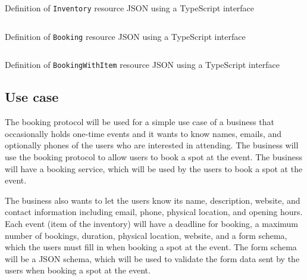 \begin{listing}
    \inputminted[breaklines]{typescript}{content/design/booking_protocol_inventory_interface.ts}
    \caption{Definition of \texttt{Inventory} resource JSON using a TypeScript interface}
    \label{code:booking_protocol_inventory_interface}
\end{listing}

\begin{listing}
    \inputminted[breaklines]{typescript}{content/design/booking_protocol_booking_interface.ts}
    \caption{Definition of \texttt{Booking} resource JSON using a TypeScript interface}
    \label{code:booking_protocol_booking_interface}
\end{listing}

\begin{listing}
    \inputminted[breaklines]{typescript}{content/design/booking_protocol_booking_with_item_interface.ts}
    \caption{Definition of \texttt{BookingWithItem} resource JSON using a TypeScript interface}
    \label{code:booking_protocol_booking_with_item_interface}
\end{listing}

\subsection{Use case}

The booking protocol will be used for a simple use case of a business that occasionally holds one-time events and it wants to know names, emails, and optionally phones of the users who are interested in attending. The business will use the booking protocol to allow users to book a spot at the event. The business will have a booking service, which will be used by the users to book a spot at the event.

The business also wants to let the users know its name, description, website, and contact information including email, phone, physical location, and opening hours. Each event (item of the inventory) will have a deadline for booking, a maximum number of bookings, duration, physical location, website, and a form schema, which the users must fill in when booking a spot at the event. The form schema will be a JSON schema, which will be used to validate the form data sent by the users when booking a spot at the event.
